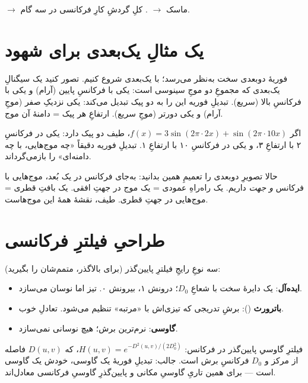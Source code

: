 \documentclass[12pt,a4paper]{article}
\begin{document}
 $\rightarrow$ ماسک $\rightarrow$ . کلِ گردشِ کارِ فرکانسی در سه گام.

\section{یک مثالِ یک‌بعدی برای شهود}

فوریهٔ دوبعدی سخت به‌نظر می‌رسد؛ با یک‌بعدی شروع کنیم. تصور کنید یک سیگنالِ یک‌بعدی که مجموعِ دو
موجِ سینوسی است: یکی با فرکانسِ پایین (آرام) و یکی با فرکانسِ بالا (سریع). تبدیلِ فوریه این را به
دو پیک تبدیل می‌کند: یکی نزدیکِ صفر (موجِ آرام) و یکی دورتر (موجِ سریع). ارتفاعِ هر پیک = دامنهٔ
آن موج.

\begin{riyazi}
اگر $f(x) = 3\sin(2\pi \cdot 2x) + \sin(2\pi \cdot 10x)$، طیف دو پیک دارد: یکی در فرکانسِ ۲ با
ارتفاعِ ۳، و یکی در فرکانسِ ۱۰ با ارتفاعِ ۱. تبدیلِ فوریه دقیقاً «چه موج‌هایی، با چه دامنه‌ای» را
بازمی‌گرداند.
\end{riyazi}

\begin{nokte}
حالا تصویرِ دوبعدی را تعمیمِ همین بدانید: به‌جای فرکانس در یک بُعد، موج‌هایی با فرکانس \emph{و
جهت} داریم. یک راه‌راهِ عمودی = یک موج در جهتِ افقی. یک بافتِ قطری = موج‌هایی در جهتِ قطری. طیف،
نقشهٔ همهٔ این موج‌هاست.
\end{nokte}

\section{طراحیِ فیلترِ فرکانسی}

سه نوعِ رایجِ فیلترِ پایین‌گذر (برای بالاگذر، متمم‌شان را بگیرید):

\begin{itemize}
  \item \textbf{ایده‌آل}: یک دایرهٔ سخت با شعاعِ $D_0$؛ درونش ۱، بیرونش ۰. تیز اما نوسان می‌سازد.
  \item \textbf{باترورث} (): برشِ تدریجی که تیزی‌اش با «مرتبه» تنظیم می‌شود. تعادلِ خوب.
  \item \textbf{گاوسی}: نرم‌ترین برش؛ هیچ نوسانی نمی‌سازد.
\end{itemize}

\begin{riyazi}
فیلترِ گاوسیِ پایین‌گذر در فرکانس: $H(u,v) = e^{-D^2(u,v)/(2D_0^2)}$، که $D(u,v)$ فاصله از مرکز
و $D_0$ فرکانسِ برش است. جالب: تبدیلِ فوریهٔ یک گاوسی، خودش یک گاوسی است — برای همین تاریِ
گاوسیِ مکانی و پایین‌گذرِ گاوسیِ فرکانسی معادل‌اند.
\end{riyazi}
\end{document}
